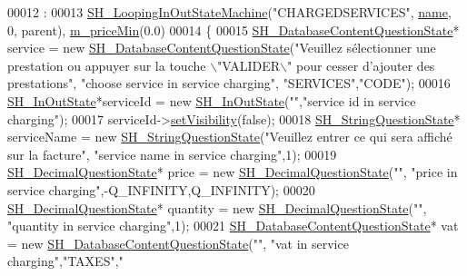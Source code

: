 \begin{DoxyCode}
00012                                                                     :
00013     \hyperlink{classSH__LoopingInOutStateMachine_ab183e4ef00fa1297e942b3a4d78b3523}{SH\_LoopingInOutStateMachine}(\textcolor{stringliteral}{"CHARGEDSERVICES"},
      \hyperlink{classSH__NamedObject_a9f686c6f2a5bcc08ad03d0cee0151f0f}{name}, 0, parent), \hyperlink{classSH__ServiceCharging_a44584a7ff1edd6ae03c4f77544136c13}{m\_priceMin}(0.0)
00014 \{
00015     \hyperlink{classSH__DatabaseContentQuestionState}{SH\_DatabaseContentQuestionState}* service = \textcolor{keyword}{new} 
      \hyperlink{classSH__DatabaseContentQuestionState}{SH\_DatabaseContentQuestionState}(\textcolor{stringliteral}{"Veuillez sélectionner une prestation ou
       appuyer sur la touche \(\backslash\)"VALIDER\(\backslash\)" pour cesser d'ajouter des prestations"}, \textcolor{stringliteral}{"choose service in service charging"},\textcolor{stringliteral}{
      "SERVICES"},\textcolor{stringliteral}{"CODE"});
00016     \hyperlink{classSH__InOutState}{SH\_InOutState}*serviceId = \textcolor{keyword}{new} \hyperlink{classSH__InOutState}{SH\_InOutState}(\textcolor{stringliteral}{""},\textcolor{stringliteral}{"service id in service
       charging"});
00017     serviceId->\hyperlink{classSH__InOutState_a7fdfaa6f600f0ac4a96f238a038ba9ad}{setVisibility}(\textcolor{keyword}{false});
00018     \hyperlink{classSH__StringQuestionState}{SH\_StringQuestionState}* serviceName = \textcolor{keyword}{new} 
      \hyperlink{classSH__StringQuestionState}{SH\_StringQuestionState}(\textcolor{stringliteral}{"Veuillez entrer ce qui sera affiché sur la facture"}, \textcolor{stringliteral}{"service
       name in service charging"},1);
00019     \hyperlink{classSH__DecimalQuestionState}{SH\_DecimalQuestionState}* price = \textcolor{keyword}{new} 
      \hyperlink{classSH__DecimalQuestionState}{SH\_DecimalQuestionState}(\textcolor{stringliteral}{""}, \textcolor{stringliteral}{"price in service charging"},-Q\_INFINITY,Q\_INFINITY);
00020     \hyperlink{classSH__DecimalQuestionState}{SH\_DecimalQuestionState}* quantity = \textcolor{keyword}{new} 
      \hyperlink{classSH__DecimalQuestionState}{SH\_DecimalQuestionState}(\textcolor{stringliteral}{""}, \textcolor{stringliteral}{"quantity in service charging"},1);
00021     \hyperlink{classSH__DatabaseContentQuestionState}{SH\_DatabaseContentQuestionState}* vat = \textcolor{keyword}{new} 
      \hyperlink{classSH__DatabaseContentQuestionState}{SH\_DatabaseContentQuestionState}(\textcolor{stringliteral}{""}, \textcolor{stringliteral}{"vat in service charging"},\textcolor{stringliteral}{"TAXES"},\textcolor{stringliteral}{"
}
\end{DoxyCode}

